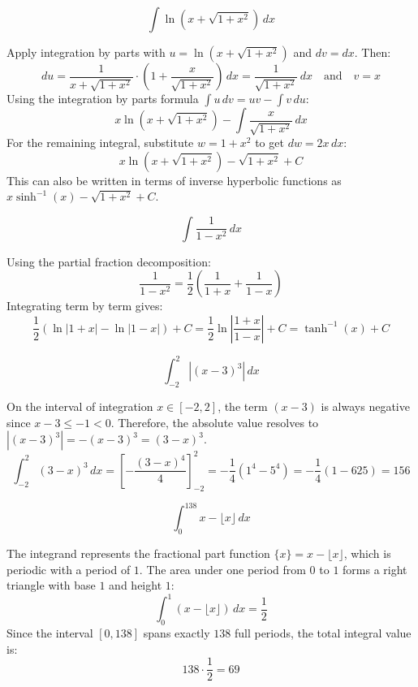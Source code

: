 \begin{questions}
    \question \[ \int \ln\left(x + \sqrt{1+x^2}\right) \,dx \]
    \begin{solution}
        Apply integration by parts with $u = \ln\left(x + \sqrt{1+x^2}\right)$ and $dv = dx$. Then:
        \[ du = \frac{1}{x + \sqrt{1+x^2}} \cdot \left(1 + \frac{x}{\sqrt{1+x^2}}\right) \,dx = \frac{1}{\sqrt{1+x^2}} \,dx \quad \text{and} \quad v = x \]
        Using the integration by parts formula $\int u \,dv = uv - \int v \,du$:
        \[ x\ln\left(x + \sqrt{1+x^2}\right) - \int \frac{x}{\sqrt{1+x^2}} \,dx \]
        For the remaining integral, substitute $w = 1 + x^2$ to get $dw = 2x \,dx$:
        \[ x\ln\left(x + \sqrt{1+x^2}\right) - \sqrt{1+x^2} + C \]
        This can also be written in terms of inverse hyperbolic functions as $x \sinh^{-1}(x) - \sqrt{1+x^2} + C$.
    \end{solution}

    \question \[ \int \frac{1}{1-x^2} \,dx \]
    \begin{solution}
        Using the partial fraction decomposition:
        \[ \frac{1}{1-x^2} = \frac{1}{2}\left(\frac{1}{1+x} + \frac{1}{1-x}\right) \]
        Integrating term by term gives:
        \[ \frac{1}{2}\left(\ln|1+x| - \ln|1-x|\right) + C = \frac{1}{2}\ln\left|\frac{1+x}{1-x}\right| + C = \tanh^{-1}(x) + C \]
    \end{solution}

    \question \[ \int_{-2}^{2} |(x-3)^3| \,dx \]
    \begin{solution}
        On the interval of integration $x \in [-2, 2]$, the term $(x-3)$ is always negative since $x-3 \le -1 < 0$. Therefore, the absolute value resolves to $|(x-3)^3| = -(x-3)^3 = (3-x)^3$.
        \[ \int_{-2}^{2} (3-x)^3 \,dx = \left[ -\frac{(3-x)^4}{4} \right]_{-2}^{2} = -\frac{1}{4}\left(1^4 - 5^4\right) = -\frac{1}{4}(1 - 625) = 156 \]
    \end{solution}

    \question \[ \int_{0}^{138} x - \lfloor x \rfloor \,dx \]
    \begin{solution}
        The integrand represents the fractional part function $\{x\} = x - \lfloor x \rfloor$, which is periodic with a period of $1$. The area under one period from $0$ to $1$ forms a right triangle with base $1$ and height $1$:
        \[ \int_{0}^{1} (x - \lfloor x \rfloor) \,dx = \frac{1}{2} \]
        Since the interval $[0, 138]$ spans exactly $138$ full periods, the total integral value is:
        \[ 138 \cdot \frac{1}{2} = 69 \]
    \end{solution}


\end{questions}
